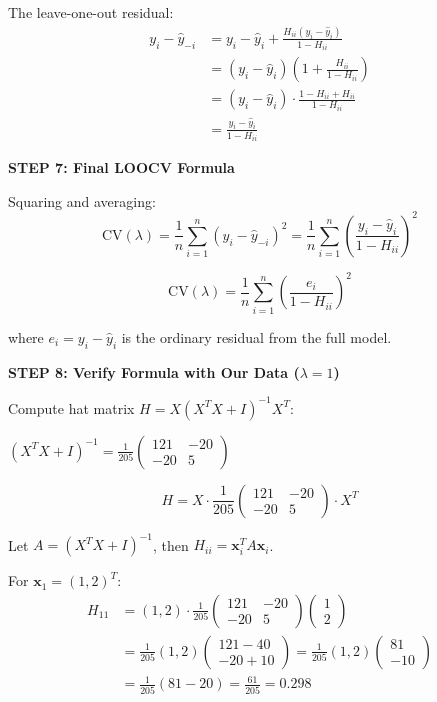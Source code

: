 \documentclass[12pt]{article}
\begin{document}
\begin{solution}
The leave-one-out residual:
\begin{align*}
y_i - \hat{y}_{-i} &= y_i - \hat{y}_i + \frac{H_{ii}(y_i - \hat{y}_i)}{1 - H_{ii}} \\
&= (y_i - \hat{y}_i)\left(1 + \frac{H_{ii}}{1 - H_{ii}}\right) \\
&= (y_i - \hat{y}_i) \cdot \frac{1 - H_{ii} + H_{ii}}{1 - H_{ii}} \\
&= \frac{y_i - \hat{y}_i}{1 - H_{ii}}
\end{align*}

\textbf{STEP 7: Final LOOCV Formula}

Squaring and averaging:
\[\text{CV}(\lambda) = \frac{1}{n}\sum_{i=1}^{n}(y_i - \hat{y}_{-i})^2 = \frac{1}{n}\sum_{i=1}^{n}\left(\frac{y_i - \hat{y}_i}{1 - H_{ii}}\right)^2\]

\[\boxed{\text{CV}(\lambda) = \frac{1}{n}\sum_{i=1}^{n}\left(\frac{e_i}{1 - H_{ii}}\right)^2}\]

where $e_i = y_i - \hat{y}_i$ is the ordinary residual from the full model.

\textbf{STEP 8: Verify Formula with Our Data ($\lambda = 1$)}

Compute hat matrix $H = X(X^TX + I)^{-1}X^T$:

$(X^TX + I)^{-1} = \frac{1}{205}\begin{pmatrix} 121 & -20 \\ -20 & 5 \end{pmatrix}$

\[H = X \cdot \frac{1}{205}\begin{pmatrix} 121 & -20 \\ -20 & 5 \end{pmatrix} \cdot X^T\]

Let $A = (X^TX + I)^{-1}$, then $H_{ii} = \mathbf{x}_i^T A \mathbf{x}_i$.

For $\mathbf{x}_1 = (1, 2)^T$:
\begin{align*}
H_{11} &= (1, 2) \cdot \frac{1}{205}\begin{pmatrix} 121 & -20 \\ -20 & 5 \end{pmatrix} \begin{pmatrix} 1 \\ 2 \end{pmatrix} \\
&= \frac{1}{205}(1, 2)\begin{pmatrix} 121 - 40 \\ -20 + 10 \end{pmatrix} = \frac{1}{205}(1, 2)\begin{pmatrix} 81 \\ -10 \end{pmatrix} \\
&= \frac{1}{205}(81 - 20) = \frac{61}{205} = 0.298
\end{align*}


\end{solution}
\end{document}
